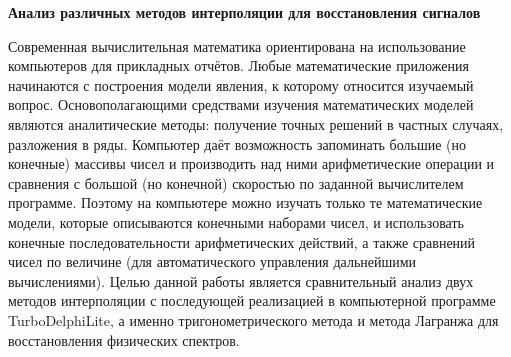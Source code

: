 
\begin{center}
\bf   \textbf{Анализ различных методов интерполяции для восстановления сигналов}
\end{center}

Современная вычислительная математика ориентирована на использование компьютеров для прикладных отчётов. Любые математические приложения начинаются с построения модели явления, к которому относится изучаемый вопрос. Основополагающими средствами изучения математических моделей являются аналитические методы: получение точных решений в частных случаях, разложения в ряды. Компьютер даёт возможность запоминать большие (но конечные) массивы чисел и производить над ними арифметические операции и сравнения с большой (но конечной) скоростью по заданной вычислителем программе. Поэтому на компьютере можно изучать только те математические модели, которые описываются конечными наборами чисел, и использовать конечные последовательности арифметических действий, а также сравнений чисел по величине (для автоматического управления дальнейшими вычислениями). Целью данной работы является сравнительный анализ двух методов интерполяции с последующей реализацией в компьютерной программе TurboDelphiLite, а именно тригонометрического метода и метода Лагранжа для восстановления физических спектров.
